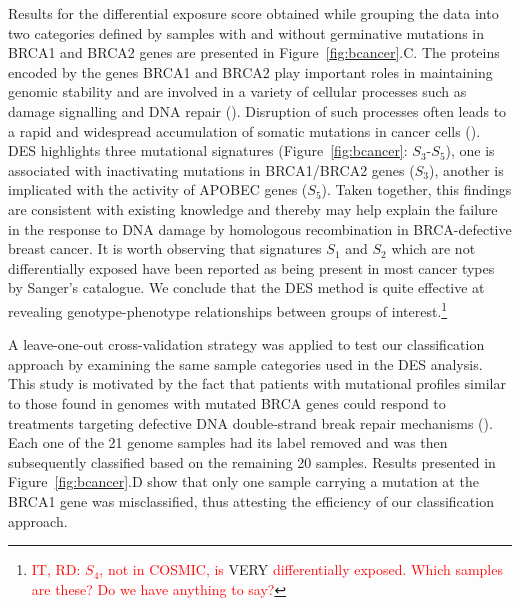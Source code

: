 \documentclass{bioinfo}
\begin{document}
Results for the differential exposure score obtained while grouping
the data into two categories defined by samples with and without
germinative mutations in BRCA1 and BRCA2 genes are presented in
Figure~\ref{fig:bcancer}.C. The proteins encoded by the genes BRCA1
and BRCA2 play important roles in maintaining genomic stability and
are involved in a variety of cellular processes such as damage
signalling and DNA repair (\citealp{LY}). Disruption of such processes
often leads to a rapid and widespread accumulation of somatic
mutations in cancer cells (\citealp{Ash}). DES highlights three
mutational signatures (Figure~\ref{fig:bcancer}: $S_3$-$S_5$), one is
associated with inactivating mutations in BRCA1/BRCA2 genes ($S_{3}$),
another is implicated with the activity of APOBEC genes ($S_5$). Taken
together, this findings are consistent with existing knowledge and
thereby may help explain the failure in the response to DNA damage by
homologous recombination in BRCA-defective breast cancer. It is worth
observing that signatures $S_1$ and $S_2$ which are not differentially
exposed have been reported as being present in most cancer types by
Sanger's catalogue. We conclude that the DES method is quite effective
at revealing genotype-phenotype relationships between groups of
interest.\footnote{\textcolor{red}{IT, RD: $S_4$, not in COSMIC, is}
VERY \textcolor{red}{differentially exposed. Which samples are these?
Do we have anything to say?}}

A leave-one-out cross-validation strategy was applied to test our
classification approach by examining the same sample categories used
in the DES analysis. This study is motivated by the fact that patients
with mutational profiles similar to those found in genomes with
mutated BRCA genes could respond to treatments targeting defective DNA
double-strand break repair mechanisms (\citealp{Ash}).  Each one of
the 21 genome samples had its label removed and was then subsequently
classified based on the remaining 20 samples.  Results presented
in Figure~\ref{fig:bcancer}.D show that only one sample carrying a
mutation at the BRCA1 gene was misclassified, thus attesting the
efficiency of our classification approach.
\end{document}

